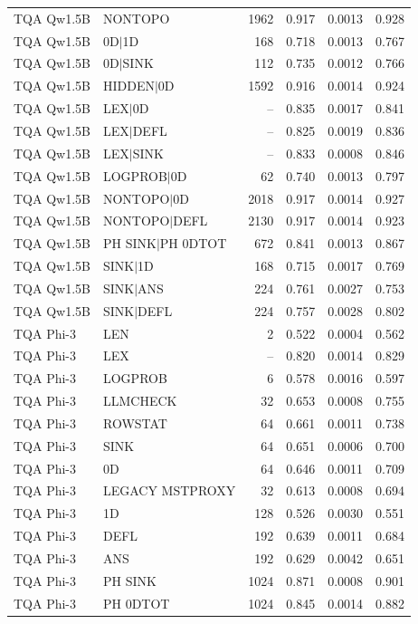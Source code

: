 \begin{longtable}{llrrrr}
TQA Qw1.5B & NONTOPO & 1962 & 0.917 & 0.0013 & 0.928 \\
TQA Qw1.5B & 0D$\mid$1D & 168 & 0.718 & 0.0013 & 0.767 \\
TQA Qw1.5B & 0D$\mid$SINK & 112 & 0.735 & 0.0012 & 0.766 \\
TQA Qw1.5B & HIDDEN$\mid$0D & 1592 & 0.916 & 0.0014 & 0.924 \\
TQA Qw1.5B & LEX$\mid$0D & -- & 0.835 & 0.0017 & 0.841 \\
TQA Qw1.5B & LEX$\mid$DEFL & -- & 0.825 & 0.0019 & 0.836 \\
TQA Qw1.5B & LEX$\mid$SINK & -- & 0.833 & 0.0008 & 0.846 \\
TQA Qw1.5B & LOGPROB$\mid$0D & 62 & 0.740 & 0.0013 & 0.797 \\
TQA Qw1.5B & NONTOPO$\mid$0D & 2018 & 0.917 & 0.0014 & 0.927 \\
TQA Qw1.5B & NONTOPO$\mid$DEFL & 2130 & 0.917 & 0.0014 & 0.923 \\
TQA Qw1.5B & PH SINK$\mid$PH 0DTOT & 672 & 0.841 & 0.0013 & 0.867 \\
TQA Qw1.5B & SINK$\mid$1D & 168 & 0.715 & 0.0017 & 0.769 \\
TQA Qw1.5B & SINK$\mid$ANS & 224 & 0.761 & 0.0027 & 0.753 \\
TQA Qw1.5B & SINK$\mid$DEFL & 224 & 0.757 & 0.0028 & 0.802 \\
TQA Phi-3 & LEN & 2 & 0.522 & 0.0004 & 0.562 \\
TQA Phi-3 & LEX & -- & 0.820 & 0.0014 & 0.829 \\
TQA Phi-3 & LOGPROB & 6 & 0.578 & 0.0016 & 0.597 \\
TQA Phi-3 & LLMCHECK & 32 & 0.653 & 0.0008 & 0.755 \\
TQA Phi-3 & ROWSTAT & 64 & 0.661 & 0.0011 & 0.738 \\
TQA Phi-3 & SINK & 64 & 0.651 & 0.0006 & 0.700 \\
TQA Phi-3 & 0D & 64 & 0.646 & 0.0011 & 0.709 \\
TQA Phi-3 & LEGACY MSTPROXY & 32 & 0.613 & 0.0008 & 0.694 \\
TQA Phi-3 & 1D & 128 & 0.526 & 0.0030 & 0.551 \\
TQA Phi-3 & DEFL & 192 & 0.639 & 0.0011 & 0.684 \\
TQA Phi-3 & ANS & 192 & 0.629 & 0.0042 & 0.651 \\
TQA Phi-3 & PH SINK & 1024 & 0.871 & 0.0008 & 0.901 \\
TQA Phi-3 & PH 0DTOT & 1024 & 0.845 & 0.0014 & 0.882 \\

\end{longtable}
